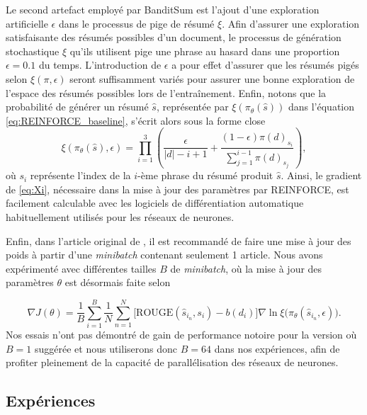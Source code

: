 Le second artefact employé par BanditSum est l'ajout d'une exploration artificielle
$\epsilon$ dans le processus de pige de résumé $\xi$.
Afin d'assurer une exploration satisfaisante des résumés possibles d'un document, le processus 
de génération stochastique $\xi$ qu'ils utilisent pige une phrase au hasard dans une 
proportion $\epsilon=0.1$ du temps.
L'introduction de $\epsilon$ a pour effet d'assurer que les résumés pigés selon $\xi(\pi, \epsilon)$ seront 
suffisamment variés pour assurer une bonne exploration de l'espace des résumés possibles lors de
l'entraînement.
Enfin, notons que la probabilité de générer un résumé $\hat{s}$, représentée par
$\xi \left(\pi_\theta(\hat{s}) \right)$ dans l'équation
\ref{eq:REINFORCE_baseline}, s'écrit alors sous la forme close
\begin{equation}
    \xi \left(\pi_\theta(\hat{s}), \epsilon \right) = \displaystyle \prod_{i=1}^3 \left(\dfrac{\epsilon}{|d| -i + 1}  + \dfrac{(1 - \epsilon)\pi(d)_{s_i}}{\sum_{j=1}^{i-1} \pi(d)_{s_j}}\right),
    \label{eq:Xi}
\end{equation}
où $s_i$ représente l'index de la $i$-ème phrase du résumé produit $\hat{s}$. 
Ainsi, le gradient de \eqref{eq:Xi}, nécessaire dans la mise à jour des paramètres 
par REINFORCE, est facilement calculable avec les logiciels de différentiation automatique
habituellement utilisés pour les réseaux de neurones.

Enfin, dans l'article original de \citet{dong2018banditsum}, il est recommandé 
de faire une mise à jour des poids à partir d'une \textit{minibatch} contenant 
seulement 1 article.
Nous avons expérimenté avec différentes tailles $B$ de \textit{minibatch}, où la 
mise à jour des paramètres $\theta$ est désormais faite selon 

\begin{equation}
    \nabla J(\theta) = \frac{1}{B}\sum_{i=1}^B \frac{1}{N} \sum_{n=1}^N \big[\text{ROUGE}(\hat{s}_{i_n}, s_i) - b(d_i)\big]\nabla \ln \xi\big(\pi_\theta (\hat{s}_{i_n}, \epsilon)\big).
    \label{eq:REINFORCE_batched}
\end{equation}
Nos essais n'ont pas démontré de gain de performance notoire pour la version où $B=1$
suggérée et nous utiliserons donc $B=64$ dans nos expériences, 
afin de profiter pleinement de la capacité de parallélisation 
des réseaux de neurones.

\subsection{Expériences}


